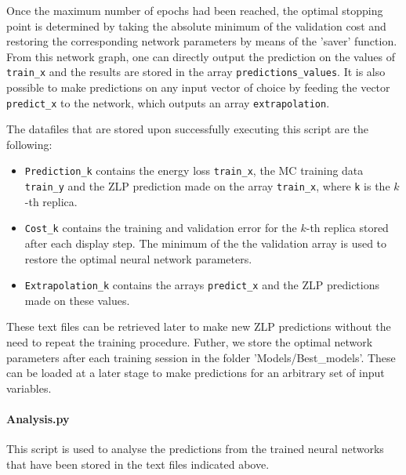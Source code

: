 \begin{itemize}
Once the maximum number of epochs 
had been reached, the optimal stopping point is determined by 
taking the absolute minimum of the validation cost
and restoring the corresponding network parameters by means of the 'saver' function.
%
From this network graph, one can directly output the prediction on the values of {\tt train\_x} and
the results are stored in the array {\tt predictions\_values}.
%
It is also possible to make predictions on any input vector of choice by feeding 
the vector {\tt predict\_x} to the 
network, which outputs an array {\tt extrapolation}.

\end{itemize}

The datafiles that are stored upon successfully
executing this script are the following:

\begin{itemize}

\item {\tt Prediction\_k} contains the energy loss {\tt train\_x}, the MC training data {\tt train\_y}
and the ZLP prediction made on the array {\tt train\_x}, where {\tt k} is the $k$-th replica. 
\item {\tt Cost\_k} contains the training and validation error for the
  $k$-th replica
stored after each display step. 
The minimum of the the validation array is used to restore the optimal
neural network parameters.
\item {\tt Extrapolation\_k} contains the arrays {\tt predict\_x} and the ZLP predictions made on these values. 
\end{itemize}
These text files can be retrieved later to make new ZLP predictions
without the need to repeat the training procedure.
%
Futher, we store the optimal network parameters after each training session in the folder
'Models/Best\_models'. 
%
These can be loaded at a later stage
to make predictions for an arbitrary set of input variables. 

\noindent
\paragraph{Analysis.py}
This script is used to analyse the predictions from the trained
neural networks that have been stored in the text files indicated above.


